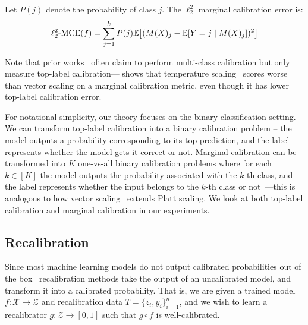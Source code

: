 \begin{definition}
\label{dfn:marginal-ce}
Let $P(j)$ denote the probability of class $j$. The $\ell_2^2$ marginal calibration error is:
\begin{align}
\ell_2^2\mbox{-MCE}(f) = \sum_{j = 1}^k P(j) \mathbb{E}\big[ (M(X)_j - \mathbb{E}[Y = j \mid M(X)_j])^2 \big]
\end{align}
\end{definition}

Note that prior works~\cite{guo2017calibration, hendrycks2019anomaly, hendrycks2019pretraining} often claim to perform multi-class calibration but only measure top-label calibration---\cite{nixon2019calibration} shows that temperature scaling~\cite{guo2017calibration} scores worse than vector scaling on a marginal calibration metric, even though it has lower top-label calibration error.


For notational simplicity, our theory focuses on the binary classification setting. We can transform top-label calibration into a binary calibration problem -- the model outputs a probability corresponding to its top prediction, and the label represents whether the model gets it correct or not. Marginal calibration can be transformed into $K$ one-vs-all binary calibration problems where for each $k \in [K]$ the model outputs the probability associated with the $k$-th class, and the label represents whether the input belongs to the $k$-th class or not~\cite{zadrozny2002transforming}---this is analogous to how vector scaling~\cite{guo2017calibration} extends Platt scaling. We look at both top-label calibration and marginal calibration in our experiments.

\subsection{Recalibration}

Since most machine learning models do not output calibrated probabilities out of the box~\cite{guo2017calibration, zadrozny2001calibrated} recalibration methods take the output of an uncalibrated model, and transform it into a calibrated probability. That is, we are given a trained model $f: \mathcal{X} \to \mathcal{Z}$ and recalibration data $T = \{ z_i, y_i \}_{i=1}^n$, and we wish to learn a recalibrator $g : \mathcal{Z} \to [0, 1]$ such that $g \circ f$ is well-calibrated.

